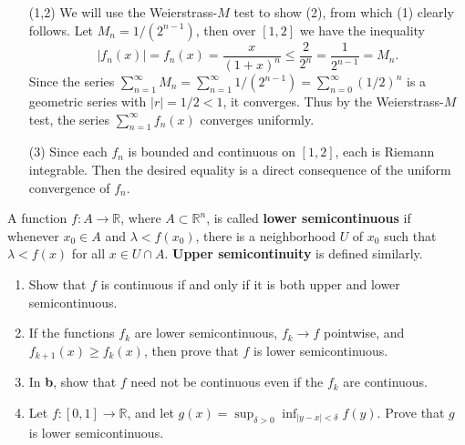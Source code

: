\documentclass[10pt]{amsart}
\newenvironment{exercise}[1]{%
        \vspace{10mm}
        \renewcommand\themanualtheoreminner{#1}%
  \manualtheoreminner
}\hrulefill{\endmanualtheoreminner}
\begin{document}
\begin{enumerate}
	\item[(1,2)] We will use the Weierstrass-$M$ test to show (2), from which (1) clearly follows. Let $M_n = 1/(2^{n-1})$, then over $[1,2]$ we have the inequality
		\[
			|f_n(x)| = f_n(x) = \frac{x}{(1+x)^n} \leq \frac{2}{2^n} = \frac{1}{2^{n-1}} = M_n.
		\] 
		Since the series $\sum_{n=1}^{\infty} M_n = \sum_{n=1}^{\infty} 1/(2^{n-1}) = \sum_{n=0}^{\infty} (1/2)^{n}$ is a geometric series with $|r| = 1/2 < 1$, it converges. Thus by the Weierstrass-$M$ test, the series $\sum_{n=1}^{\infty} f_n(x)$ converges uniformly.

	\item[(3)] Since each $f_n$ is bounded and continuous on $[1,2]$, each is Riemann integrable. Then the desired equality is a direct consequence of the uniform convergence of $f_n$.
\end{enumerate}

\begin{exercise}{Page 318, Ex. 12}
	A function $f:A \to \mathbb{R}$, where $A \subset \mathbb{R}^n$, is called \textbf{lower semicontinuous} if whenever $x_0\in A$ and $\lambda<f(x_0)$, there is a neighborhood $U$ of $x_0$ such that $\lambda<f(x)$ for all $x \in U \cap A$. \textbf{Upper semicontinuity} is defined similarly.
	\begin{enumerate}
		\item Show that $f$ is continuous if and only if it is both upper and lower semicontinuous.
		\item If the functions $f_k$ are lower semicontinuous, $f_k \to f$ pointwise, and $f_{k+1}(x) \geq f_k(x)$, then prove that $f$ is lower semicontinuous.
		\item In \textbf{b}, show that $f$ need not be continuous even if the $f_k$ are continuous.
		\item Let $f:[0,1] \to \mathbb{R}$, and let $g(x) = \sup_{\delta>0}\inf_{|y-x|<\delta}f(y)$. Prove that $g$ is lower semicontinuous.
	\end{enumerate}
\end{exercise}
\end{document}
